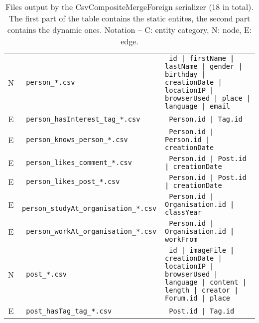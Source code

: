\begin{table}[htb]
\begin{tabularx}{\linewidth}{|>{\sffamily}c|>{\tt}l|>{\tt}X|}
        N                    & person\_*.csv                        & id | firstName | lastName | gender | birthday | creationDate | locationIP | browserUsed | place | language | email  \\
        E                    & person\_hasInterest\_tag\_*.csv      & Person.id | Tag.id                                                                                                  \\
        E                    & person\_knows\_person\_*.csv         & Person.id | Person.id | creationDate                                                                                \\
        E                    & person\_likes\_comment\_*.csv        & Person.id | Post.id | creationDate                                                                                  \\
        E                    & person\_likes\_post\_*.csv           & Person.id | Post.id | creationDate                                                                                  \\
        E                    & person\_studyAt\_organisation\_*.csv & Person.id | Organisation.id | classYear                                                                             \\
        E                    & person\_workAt\_organisation\_*.csv  & Person.id | Organisation.id | workFrom                                                                              \\
        \hline
        N                    & post\_*.csv                          & id | imageFile | creationDate | locationIP | browserUsed | language | content | length | creator | Forum.id | place \\
        E                    & post\_hasTag\_tag\_*.csv             & Post.id | Tag.id                                                                                                    \\
        \hline
    \end{tabularx}
    \caption{Files output by the CsvCompositeMergeForeign serializer (18 in total). The first part of the table contains the static entites, the second part contains the dynamic ones.
        Notation -- \textsf{C}: entity category, \textsf{N}: node, \textsf{E}: edge.}
    \label{table:csv_composite_merge_foreign}
\end{table}
